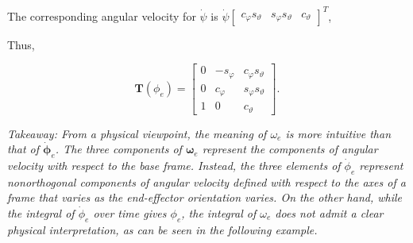 \documentclass[10pt]{article}
\begin{document}
  
The corresponding angular velocity for   $\dot{\psi}$ is   $\dot{\psi}\left[\begin{array}{lll}c_{\varphi} s_{\vartheta} & s_{\varphi} s_{\vartheta} & c_{\vartheta}\end{array}\right]^{T}$,





Thus,

$$
\boldsymbol{T}\left(\phi_{e}\right) =\left[\begin{array}{ccc}
0 & -s_{\varphi} & c_{\varphi} s_{\vartheta} \\
0 & c_{\varphi} & s_{\varphi} s_{\vartheta} \\
1 & 0 & c_{\vartheta}
\end{array}\right] .
$$


\emph{Takeaway:
From a physical viewpoint, the meaning of $\omega_{e}$ is more intuitive than that of $\dot{\boldsymbol{\phi}}_{e}$. The three components of $\boldsymbol{\omega}_{e}$ represent the components of angular velocity with respect to the base frame. Instead, the three elements of $\dot{\phi}_{e}$ represent nonorthogonal components of angular velocity defined with respect to the axes of a frame that varies as the end-effector orientation varies. On the other hand, while the integral of $\dot{\phi}_{e}$ over time gives $\phi_{e}$, the integral of $\omega_{e}$ does not admit a clear physical interpretation, as can be seen in the following example.
}
\end{document}
